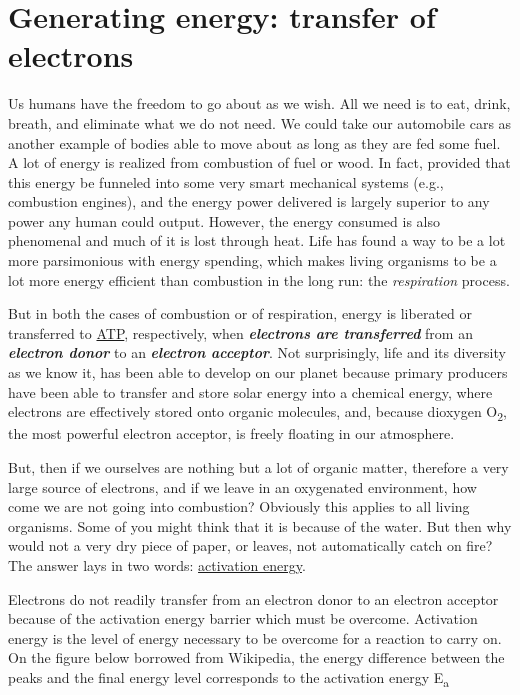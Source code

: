 \documentclass[]{book}
\theoremstyle{definition}
\theoremstyle{definition}
\theoremstyle{definition}
\theoremstyle{remark}
\begin{document}
\section{Generating energy: transfer of
electrons}\label{generating-energy-transfer-of-electrons}

Us humans have the freedom to go about as we wish. All we need is to
eat, drink, breath, and eliminate what we do not need. We could take our
automobile cars as another example of bodies able to move about as long
as they are fed some fuel. A lot of energy is realized from combustion
of fuel or wood. In fact, provided that this energy be funneled into
some very smart mechanical systems (e.g., combustion engines), and the
energy power delivered is largely superior to any power any human could
output. However, the energy consumed is also phenomenal and much of it
is lost through heat. Life has found a way to be a lot more parsimonious
with energy spending, which makes living organisms to be a lot more
energy efficient than combustion in the long run: the \emph{respiration}
process.

But in both the cases of combustion or of respiration, energy is
liberated or transferred to \protect\hyperlink{ATP}{ATP}, respectively,
when \emph{\textbf{electrons are transferred}} from an
\emph{\textbf{electron donor}} to an \emph{\textbf{electron acceptor}}.
Not surprisingly, life and its diversity as we know it, has been able to
develop on our planet because primary producers have been able to
transfer and store solar energy into a chemical energy, where electrons
are effectively stored onto organic molecules, and, because dioxygen
O\textsubscript{2}, the most powerful electron acceptor, is freely
floating in our atmosphere.

But, then if we ourselves are nothing but a lot of organic matter,
therefore a very large source of electrons, and if we leave in an
oxygenated environment, how come we are not going into combustion?
Obviously this applies to all living organisms. Some of you might think
that it is because of the water. But then why would not a very dry piece
of paper, or leaves, not automatically catch on fire? The answer lays in
two words:
\href{https://en.wikipedia.org/wiki/Activation_energy}{activation
energy}.

Electrons do not readily transfer from an electron donor to an electron
acceptor because of the activation energy barrier which must be
overcome. Activation energy is the level of energy necessary to be
overcome for a reaction to carry on. On the figure below borrowed from
Wikipedia, the energy difference between the peaks and the final energy
level corresponds to the activation energy E\textsubscript{a}
\end{document}
